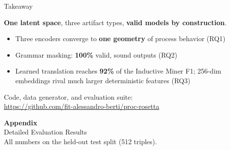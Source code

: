 \documentclass[aspectratio=169]{beamer}
\newcommand{\keyc}[1]{\textbf{\textcolor{procblue}{#1}}}
\newcommand{\keyg}[1]{\textbf{\textcolor{procgreen!70!black}{#1}}}
\begin{document}
\begin{frame}{Takeaway}
  \begin{block}{}
    \centering
    \keyc{One latent space}, three artifact types,
    \keyg{valid models by construction}.
  \end{block}
  \vspace{4mm}
  \begin{itemize}\setlength{\itemsep}{8pt}
    \item Three encoders converge to \keyc{one geometry} of process behavior (RQ1)
    \item Grammar masking: \keyg{100\%} valid, sound outputs (RQ2)
    \item Learned translation reaches \keyc{92\%} of the Inductive Miner F1;
      256-dim embeddings rival much larger deterministic features (RQ3)
  \end{itemize}
  \vspace{4mm}
  \centering\small Code, data generator, and evaluation suite:\\
  \url{https://github.com/fit-alessandro-berti/proc-rosetta}
\end{frame}

\appendix

\begin{frame}
  \centering
  {\LARGE \textbf{\textcolor{procblue}{Appendix}}}\\[3mm]
  {\large Detailed Evaluation Results}\\[5mm]
  \small All numbers on the held-out test split (512 triples).
\end{frame}
\end{document}

